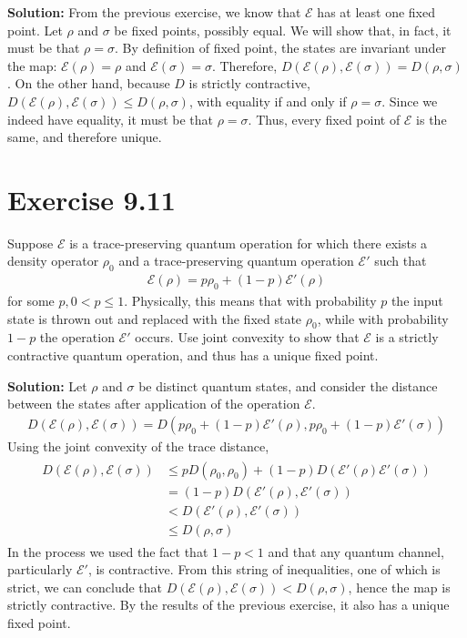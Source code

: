 \documentclass{book}
\newcommand{\mc}[1]{\mathcal{#1}}
\begin{document}
    \textbf{Solution:} From the previous exercise, we know that $\mc{E}$ has at least one fixed point. Let $\rho$ and $\sigma$ be fixed points, possibly equal. We will show that, in fact, it must be that $\rho = \sigma$. By definition of fixed point, the states are invariant under the map: $\mc{E}(\rho) = \rho$ and $\mc{E}(\sigma) = \sigma$. Therefore, $D(\mc{E}(\rho),\mc{E}(\sigma)) = D(\rho, \sigma)$. On the other hand, because $D$ is strictly contractive, $D(\mc{E}(\rho), \mc{E}(\sigma)) \leq D(\rho, \sigma)$, with equality if and only if $\rho = \sigma$. Since we indeed have equality, it must be that $\rho = \sigma$. Thus, every fixed point of $\mc{E}$ is the same, and therefore unique.

\section*{Exercise 9.11}
    Suppose $\mc{E}$ is a trace-preserving quantum operation for which there exists a density operator $\rho_0$ and a trace-preserving quantum operation $\mc{E}'$ such that
    \begin{align}
        \mc{E}(\rho) = p\rho_0 + (1-p)\mc{E}'(\rho)
    \end{align}
    for some $p, 0 < p \leq 1$. Physically, this means that with probability $p$ the input state is thrown out and replaced with the fixed state $\rho_0$, while with probability $1 - p$ the operation $\mc{E}'$ occurs. Use joint convexity to show that $\mc{E}$ is a strictly contractive quantum operation, and thus has a unique fixed point.
    
    \textbf{Solution:} Let $\rho$ and $\sigma$ be distinct quantum states, and consider the distance between the states after application of the operation $\mc{E}$.
    \begin{align}
        D(\mc{E}(\rho),\mc{E}(\sigma)) = D(p\rho_0 + (1-p)\mc{E}'(\rho), p \rho_0 + (1-p)\mc{E}'(\sigma))
    \end{align}
    Using the joint convexity of the trace distance,
    \begin{align}
    \begin{aligned}
        D(\mc{E}(\rho),\mc{E}(\sigma)) &\leq p D(\rho_0, \rho_0) + (1-p)D(\mc{E}'(\rho) \mc{E}'(\sigma)) \\
        &= (1-p) D(\mc{E}'(\rho), \mc{E}'(\sigma)) \\
        &< D(\mc{E}'(\rho), \mc{E}'(\sigma))\\
        &\leq D(\rho, \sigma)
    \end{aligned}
    \end{align}
    In the process we used the fact that $1-p <1$ and that any quantum channel, particularly $\mc{E}'$, is contractive. From this string of inequalities, one of which is strict, we can conclude that $D(\mc{E}(\rho), \mc{E}(\sigma)) < D(\rho, \sigma)$, hence the map is strictly contractive. By the results of the previous exercise, it also has a unique fixed point. 
    
\end{document}
